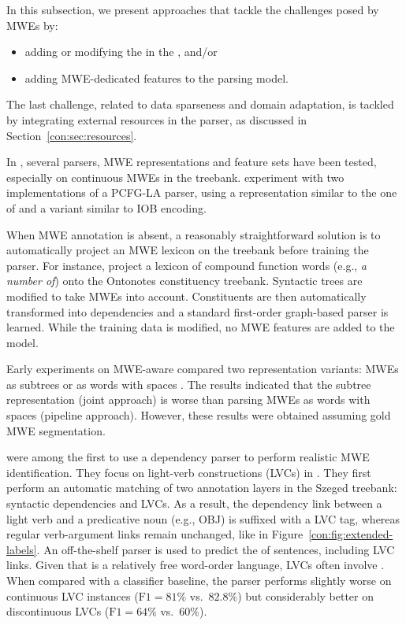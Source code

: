 \documentclass[output=paper]{langsci/langscibook}
\begin{document}
In this subsection, we present approaches that tackle the challenges posed by MWEs by:
\begin{itemize}
 \item adding or modifying the  in the , and\slash or
 \item adding MWE-dedicated features to the parsing model.
\end{itemize}
The last challenge, related to data sparseness and domain adaptation, is tackled by integrating external resources in the parser, as discussed in Section~\ref{con:sec:resources}.


In , several parsers, MWE representations and feature sets have been tested, especially on continuous MWEs in the  treebank. 
\citet{constant13combining} experiment with two implementations of a PCFG-LA parser, using a representation similar to the one of \citet{green11} and a variant similar to IOB encoding.

When MWE annotation is absent, a reasonably straightforward solution is to automatically project an MWE lexicon on the treebank before training the parser.
For instance, \citet{kato16} project a lexicon of compound function words (e.g., \textit{a number of}) onto the  Ontonotes constituency treebank. 
Syntactic trees are modified to take MWEs into account.
Constituents are then automatically transformed into dependencies and a standard first-order graph-based parser is learned.
While the training data is modified, no MWE features are added to the model.

Early experiments on MWE-aware  compared two representation variants: MWEs as subtrees or as words with spaces \citep{nivre04b}.
The results indicated that the subtree representation (joint approach) is worse than parsing MWEs as words with spaces (pipeline approach).
However, these results were obtained assuming gold MWE segmentation. %

\citet{vincze13} were among the first to use a dependency parser to perform realistic MWE identification.
They focus on light-verb constructions (LVCs) in .
They first perform an automatic matching of two annotation layers in the Szeged treebank: syntactic dependencies and LVCs.
As a result, the  dependency link between a light verb and a predicative noun (e.g., OBJ) is suffixed with a LVC tag, whereas regular verb-argument links remain unchanged, like in Figure~\ref{con:fig:extended-labels}. An off-the-shelf parser is used to predict the  of sentences, including LVC links.
Given that  is a relatively free word-order language, LVCs often involve .
When compared with a classifier baseline, the parser performs slightly worse on continuous LVC instances ($\text{F1}=81\%$ vs.\ $82.8\%$) but considerably better on discontinuous LVCs ($\text{F1}=64\%$ vs.\ $60\%$).
\end{document}
